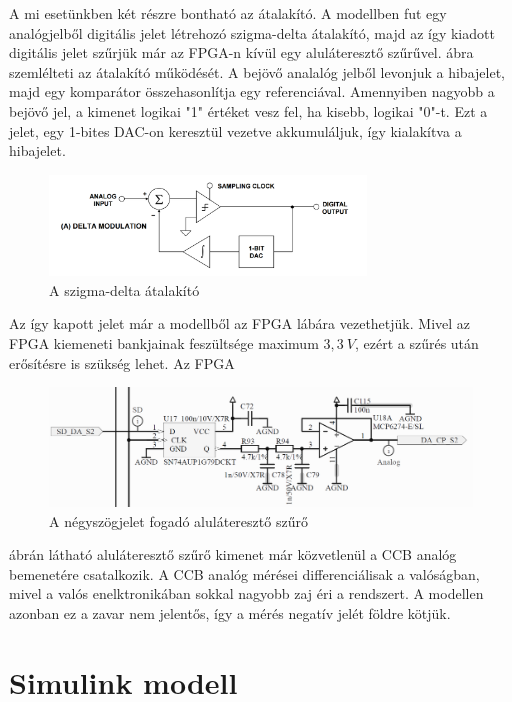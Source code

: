 A mi esetünkben két részre bontható az átalakító. A modellben fut egy analógjelből digitális jelet létrehozó szigma-delta átalakító, majd az így kiadott digitális jelet szűrjük már az FPGA-n kívül egy aluláteresztő szűrűvel.  ábra szemlélteti az átalakító működését. A bejövő analalóg jelből levonjuk a hibajelet, majd egy komparátor összehasonlítja egy referenciával. Amennyiben nagyobb a bejövő jel, a kimenet logikai "1" értéket vesz fel, ha kisebb, logikai "0"-t. Ezt a jelet, egy 1-bites DAC-on keresztül vezetve akkumuláljuk, így kialakítva a hibajelet. 

\begin{figure}[!h]
	\centering
	\includegraphics[width = 0.75\textwidth]{figures/sigmadelta.png}
	\caption{A szigma-delta átalakító} 
	\label{fig:sigmadelta}
\end{figure}

Az így kapott jelet már a modellből az FPGA lábára vezethetjük. Mivel az FPGA kiemeneti bankjainak feszültsége maximum $3,3\ V$, ezért a szűrés után erősítésre is szükség lehet. Az FPGA 

\begin{figure}[!h]
	\centering
	\includegraphics[width = \textwidth]{figures/lowpassfilter.png}
	\caption{A négyszögjelet fogadó aluláteresztő szűrő} 
	\label{fig:lowpass}
\end{figure}

 ábrán látható aluláteresztő szűrő kimenet már közvetlenül a CCB analóg bemenetére csatalkozik. A CCB analóg mérései differenciálisak a valóságban, mivel a valós enelktronikában sokkal nagyobb zaj éri a rendszert. A modellen azonban ez a zavar nem jelentős, így a mérés negatív jelét földre kötjük.

\section{Simulink modell}

